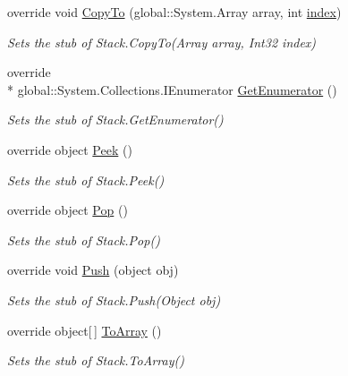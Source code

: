\begin{DoxyCompactItemize}
override void \hyperlink{class_system_1_1_collections_1_1_fakes_1_1_stub_stack_a8c9986acc0098257ead5e5784d09640b}{Copy\-To} (global\-::\-System.\-Array array, int \hyperlink{jquery-1_810_82-vsdoc_8js_a75bb12d1f23302a9eea93a6d89d0193e}{index})
\begin{DoxyCompactList}\small\item\em Sets the stub of Stack.\-Copy\-To(\-Array array, Int32 index)\end{DoxyCompactList}\item 
override \\*
global\-::\-System.\-Collections.\-I\-Enumerator \hyperlink{class_system_1_1_collections_1_1_fakes_1_1_stub_stack_a842d37504dac573bf48aebaca27214c1}{Get\-Enumerator} ()
\begin{DoxyCompactList}\small\item\em Sets the stub of Stack.\-Get\-Enumerator()\end{DoxyCompactList}\item 
override object \hyperlink{class_system_1_1_collections_1_1_fakes_1_1_stub_stack_a48aeca834397af459d7af04bcf4c4b26}{Peek} ()
\begin{DoxyCompactList}\small\item\em Sets the stub of Stack.\-Peek()\end{DoxyCompactList}\item 
override object \hyperlink{class_system_1_1_collections_1_1_fakes_1_1_stub_stack_a6b8c8beb80d6d77874751b9c3f4001e7}{Pop} ()
\begin{DoxyCompactList}\small\item\em Sets the stub of Stack.\-Pop()\end{DoxyCompactList}\item 
override void \hyperlink{class_system_1_1_collections_1_1_fakes_1_1_stub_stack_a008fb3d2a75bdad6d99734ef87f8c072}{Push} (object obj)
\begin{DoxyCompactList}\small\item\em Sets the stub of Stack.\-Push(\-Object obj)\end{DoxyCompactList}\item 
override object\mbox{[}$\,$\mbox{]} \hyperlink{class_system_1_1_collections_1_1_fakes_1_1_stub_stack_a174af7d49d78d6f9f43038fd0c54f09f}{To\-Array} ()
\begin{DoxyCompactList}\small\item\em Sets the stub of Stack.\-To\-Array()\end{DoxyCompactList}\end{DoxyCompactItemize}
